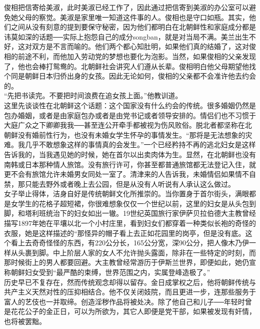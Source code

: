 俊相把信寄给美淑，此时美淑已经工作了，因此通过把信寄到美淑的办公室可以避免她父母的察觉。美淑是家里唯一知道这件事的人。俊相也是守口如瓶。其实，他们之间从没有刻意的提到要保守秘密，因为他们都明白在北朝鲜性和家庭成分都是讳莫如深的话题──实际上抱怨自己的成分songban，就是对当局不满。美兰出生不好，这对双方是不言而喻的。他们两个都心知肚明，如果他们真的结婚了，这对俊相的前途不利，而他加入劳动党的梦想也要化为泡影。当然，如果俊相的父亲发现了，他也会棒打鸳鸯的。北朝鲜社会讲究人们遵从长辈。俊相明白他父母期望他找个同是朝鲜日本归侨出身的女孩。因此无论如何，俊相的父亲都不会准许他去约会的。\\

“先把书读完。不要把时间浪费在追女孩上面。”他教训道。\\

这里先谈谈性在北朝鲜这个话题：这个国家没有什么约会的传统。很多婚姻仍然是包办婚姻，或者是由家庭包办或者是由党书记或者领导安排的。情侣们也不习惯于大庭广众之下卿卿我我──甚至连公开牵手都被视为伤风败俗。脱北者都坚称在北朝鲜没有婚前性行为，也没有未婚女学生怀孕的事情发生。“那将是无法想象的灾难。我几乎不敢想象这样的事情真的会发生。”一个已经矜持不再的逃北妇女是这样告诉我的，当我遇见她的时候，她在首尔以出卖肉体为生。显然，在北朝鲜也没有南韩或日本那种情人旅馆。没有旅行许可，你甚至都普通旅馆都无法登记入住，就更不会有旅馆允许未婚男女同处一室了。清津来的人告诉我，未婚情侣如果情不自禁，那只能去野外或者晚上去公园，但是从没有人听说有人承认这么做过。\\

女子举止得体，洁身自好是传统朝鲜文化所推崇的。当你置身于首尔街头，满眼都是女学生的花格子超短裙，你很难想象仅仅一个世纪以前，这里的妇女是从头包到脚，和塔利班统治下的妇女如出一辙。19世纪英国旅行家伊萨贝拉伯德大主教曾经描写1897年她在平壤以北一个小村庄里，看到妇女们都穿着一种类似长袍的奇怪的衣服，她是这样描述的“那怪异的帽子看上去正如花园里的岗亭，但是没有底。这个看上去奇奇怪怪的东西，有220公分长，165公分宽，深90公分，把人像木乃伊一样从头裹到脚。中上阶层人家的女人不允许抛头露面，除非在一些特定的时刻，而那时候街上的男人都要回避。大主教曾经常游历于伊斯兰世界，即便如此，她仍宣称朝鲜妇女受到“最严酷的束缚，世界范围之内，实属登峰造极了。”\\

历史早已不复存在，然而传统观念却得以留存。金日成掌权之后，他将朝鲜传统与共产主义天然对性的压抑相结合。他不仅关闭妓院，而且更进一步，连那些服务于富人的艺伎也一并取缔。创造淫秽作品将被处决。除了他自己和儿子──年轻时曾是花花公子的金正日，可以为所欲为，其它人即便是党干部，如果被发现有奸情，也将被罢黜。\\

